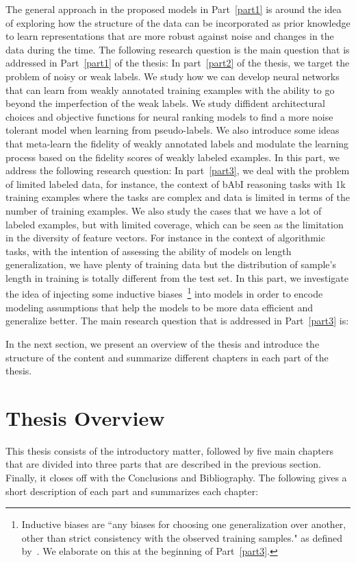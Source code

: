 The general approach in the proposed models in Part~\ref{part1} is around the idea of exploring how the structure of the data can be incorporated as prior knowledge to learn representations that are more robust against noise and changes in the data during the time. 
The following research question is the main question that is addressed in Part~\ref{part1} of the thesis:
%
In part~\ref{part2} of the thesis, we target the problem of noisy or weak labels. We study how we can develop neural networks that can learn from weakly annotated training examples with the ability to go beyond the imperfection of the weak labels. We study diffident architectural choices and objective functions for neural ranking models to find a more noise tolerant model when learning from pseudo-labels.  We also introduce some ideas that meta-learn the fidelity of weakly annotated labels and modulate the learning process based on the fidelity scores of weakly labeled examples.
In this part, we address the following research question:
%
In part~\ref{part3}, we deal with the problem of limited labeled data, for instance, the context of bAbI reasoning tasks with 1k training examples where the tasks are complex and data is limited in terms of the number of training examples. We also study the cases that we have a lot of labeled examples, but with limited coverage, which can be seen as the limitation in the diversity of feature vectors. For instance in the context of algorithmic tasks, with the intention of assessing the ability of models on length generalization, we have plenty of training data but the distribution of sample's length in training is totally different from the test set. 
In this part, we investigate the idea of injecting some inductive biases~\footnote{Inductive biases are ``any biases for choosing one generalization over another, other than strict consistency with the observed training samples." as defined by~\citet{Mitchell80theneed}. We elaborate on this at the beginning of Part~\ref{part3}.} into models in order to encode modeling assumptions that help the models to be more data efficient and generalize better.
The main research question that is addressed in Part~\ref{part3} is:

In the next section, we present an overview of the thesis and introduce the structure of the content and summarize different chapters in each part of the thesis.

\section{Thesis Overview}
This thesis consists of the introductory matter, followed by five main
chapters that are divided into three parts that are described in the previous section. Finally, it closes off with the Conclusions and Bibliography. 
The following gives a short description of each part and summarizes each chapter: 

